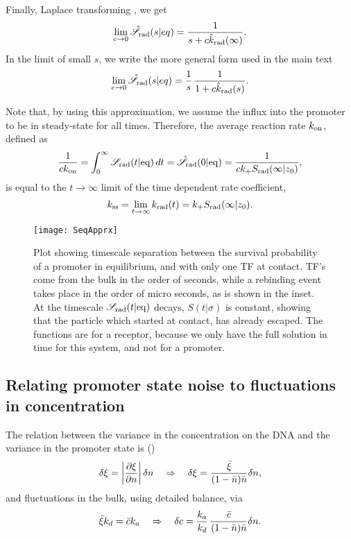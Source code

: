 Finally, Laplace transforming , we get
\begin{equation}
 \lim_{c \to 0} \hat{\mathscr{S}}_{\rm rad}(s|eq) = \frac{1}{s + c \hat{k}_{\rm rad}(\infty)}.
\end{equation}
In the limit of small $s$, we write the more general form used in the main text
\begin{equation}
 \lim_{c \to 0} \hat{\mathscr{S}}_{\rm rad}(s|eq) = \frac{1}{s} \, \frac{1}{1 + c \hat{k}_{\rm rad}(s)}.
\end{equation}

Note that, by using this approximation, we assume the influx into the promoter to be in steady-state for all times. Therefore, the average reaction rate $k_{\rm on}$, defined as
\begin{equation}
 \frac{1}{c k_{\rm on}} = \int_0^\infty \mathscr{S}_{\rm rad}(t|{\rm eq}) \, dt = \hat{\mathscr{S}}_{\rm rad}(0|{\rm eq}) = \frac{1}{c k_+ S_{\rm rad}(\infty|z_0)},
\end{equation}
is equal to the $t\to\infty$ limit of the time dependent rate coefficient, 
\begin{equation}
 k_{\rm ss} = \lim_{t \to \infty} k_{\rm rad}(t) = k_+ S_{\rm rad}(\infty|z_0).
\end{equation}

\begin{figure}[hb!]
\centering
\texttt{[image: SeqApprx]}
\caption{ Plot showing timescale separation between the survival probability of a promoter in equilibrium, and with only one TF at contact. TF's come from the bulk in the order of seconds, while a rebinding event takes place in the order of micro seconds, as is shown in the inset. At the timescale $\mathscr{S}_{\rm rad}(t|{\rm eq})$ decays, $S(t|\sigma)$ is constant, showing that the particle which started at contact, has already escaped. The functions are for a receptor, because we only have the full solution in time for this system, and not for a promoter.}
\end{figure}

\subsection{ Relating promoter state noise to fluctuations in concentration}
The relation between the variance in the concentration on the DNA and the variance in the promoter state is ()
\begin{equation}
 \delta \xi = \left|\frac{\partial \xi}{\partial n}\right| \delta n \quad \Rightarrow \quad  \delta \xi = \frac{\bar{\xi}}{(1-\bar{n})\bar{n}}\delta n,
 \elabel{EqxiNoise}
\end{equation}
and fluctuations in the bulk, using detailed balance, via
\begin{equation}
 \bar{\xi} k_d = \bar{c} k_a \quad \Rightarrow \quad \delta c = \frac{k_a}{k_d} \, \frac{\bar{c}}{(1-\bar{n})\bar{n}}\delta n.
 \elabel{EqcNoise}
\end{equation}

